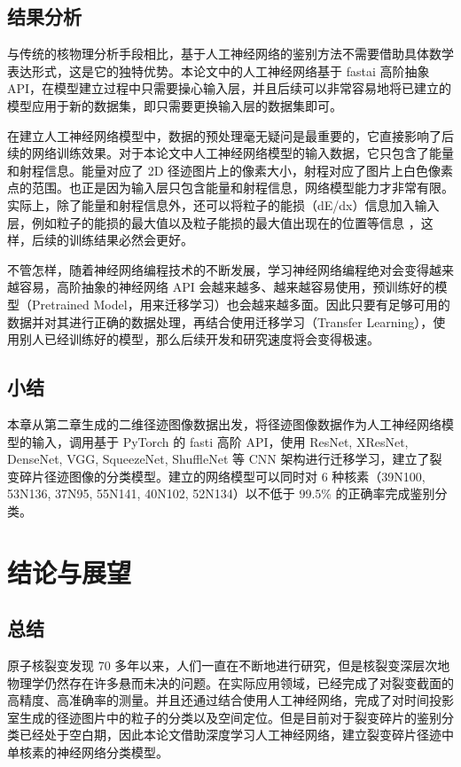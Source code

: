 \documentclass[AutoFakeBold]{LZUThesis}
\begin{document}
\section{结果分析}
与传统的核物理分析手段相比，基于人工神经网络的鉴别方法不需要借助具体数学表达形式，这是它的独特优势。本论文中的人工神经网络基于 fastai 高阶抽象 API，在模型建立过程中只需要操心输入层，并且后续可以非常容易地将已建立的模型应用于新的数据集，即只需要更换输入层的数据集即可。

在建立人工神经网络模型中，数据的预处理毫无疑问是最重要的，它直接影响了后续的网络训练效果。对于本论文中人工神经网络模型的输入数据，它只包含了能量和射程信息。能量对应了 2D 径迹图片上的像素大小，射程对应了图片上白色像素点的范围。也正是因为输入层只包含能量和射程信息，网络模型能力才非常有限。实际上，除了能量和射程信息外，还可以将粒子的能损（dE/dx）信息加入输入层，例如粒子的能损的最大值以及粒子能损的最大值出现在的位置等信息 \cite{闫洋洋2018用于高精度裂变截面测量的时间投影室}，这样，后续的训练结果必然会更好。

不管怎样，随着神经网络编程技术的不断发展，学习神经网络编程绝对会变得越来越容易，高阶抽象的神经网络 API 会越来越多、越来越容易使用，预训练好的模型（Pretrained Model，用来迁移学习）也会越来越多面。因此只要有足够可用的数据并对其进行正确的数据处理，再结合使用迁移学习（Transfer Learning），使用别人已经训练好的模型，那么后续开发和研究速度将会变得极速。



\section{小结}
本章从第二章生成的二维径迹图像数据出发，将径迹图像数据作为人工神经网络模型的输入，调用基于 PyTorch 的 fasti 高阶 API，使用 ResNet, XResNet, DenseNet, VGG, SqueezeNet, ShuffleNet 等 CNN 架构进行迁移学习，建立了裂变碎片径迹图像的分类模型。建立的网络模型可以同时对 6 种核素（39N100, 53N136, 37N95, 55N141, 40N102, 52N134）以不低于 99.5\% 的正确率完成鉴别分类。








\chapter{结论与展望}
\section{总结}
原子核裂变发现 70 多年以来，人们一直在不断地进行研究，但是核裂变深层次地物理学仍然存在许多悬而未决的问题。在实际应用领域，已经完成了对裂变截面的高精度、高准确率的测量。并且还通过结合使用人工神经网络，完成了对时间投影室生成的径迹图片中的粒子的分类以及空间定位。但是目前对于裂变碎片的鉴别分类已经处于空白期，因此本论文借助深度学习人工神经网络，建立裂变碎片径迹中单核素的神经网络分类模型。
\end{document}
